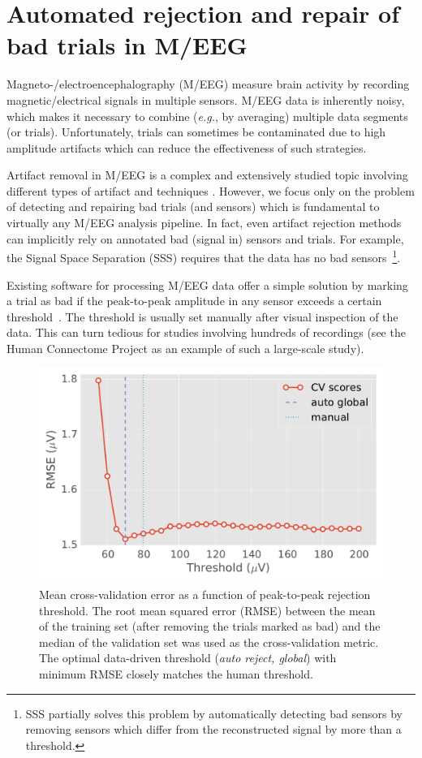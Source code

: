 \chapter{Automated rejection and repair of bad trials in M/EEG}
\label{chapter:auto_reject}

Magneto-/electroencephalography (M/EEG) measure brain activity by recording magnetic/electrical signals in multiple sensors. M/EEG data is inherently noisy, which makes it necessary to combine (\textit{e.g.}, by averaging) multiple data segments (or trials). Unfortunately, trials can sometimes be contaminated due to high amplitude artifacts which can reduce the effectiveness of such strategies.

Artifact removal in M/EEG is a complex and extensively studied topic involving different types of artifact and techniques \citep{mullen2015real, vigario1997extraction, uusitalo1997signal, taulu2004suppression, de2007denoising}. However, we focus only on the problem of detecting and repairing bad trials (and sensors) which is fundamental to virtually any M/EEG analysis pipeline. In fact, even artifact rejection methods can implicitly rely on annotated bad (signal in) sensors and trials. For example, the Signal Space Separation (SSS) requires that the data has no bad sensors~\footnote{SSS partially solves this problem by automatically detecting bad sensors by removing sensors which differ from the reconstructed signal by more than a threshold.}.

Existing software for processing M/EEG data offer a simple solution by marking a trial as bad if the peak-to-peak amplitude in any sensor exceeds a certain threshold~\citep{mne}. The threshold is usually set manually after visual inspection of the data. This can turn tedious for studies involving hundreds of recordings (see the Human Connectome Project \citep{van2012human} as an example of such a large-scale study).

\begin{figure}[t]
\begin{center}
	\includegraphics[width=0.7\linewidth]{figures/figure1.pdf}
\end{center}
    \caption{Mean cross-validation error as a function of peak-to-peak rejection threshold. The root mean squared error (RMSE) between the mean of the training set (after removing the trials marked as bad) and the median of the validation set was used as the cross-validation metric. The optimal data-driven  threshold (\emph{auto reject, global}) with minimum RMSE closely matches the human threshold.
 }
    \label{fig:basic_cv}
\end{figure}

